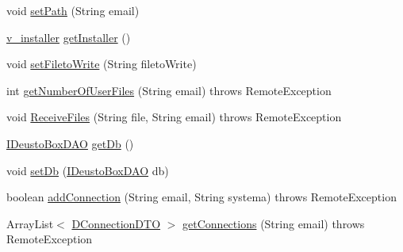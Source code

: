 \begin{DoxyCompactItemize}
void \mbox{\hyperlink{classes_1_1deusto_1_1bspq18_1_1e6_1_1_deusto_box_1_1_server_1_1remote_1_1_deusto_box_remote_service_a713a21168a4d89ed58ebfe63e4a38739}{set\+Path}} (String email)
\item 
\mbox{\hyperlink{classes_1_1deusto_1_1bspq18_1_1e6_1_1_deusto_box_1_1_server_1_1gui_1_1v__installer}{v\+\_\+installer}} \mbox{\hyperlink{classes_1_1deusto_1_1bspq18_1_1e6_1_1_deusto_box_1_1_server_1_1remote_1_1_deusto_box_remote_service_ae2e8dc87a5f16722a6bec1a6ff87ed52}{get\+Installer}} ()
\item 
void \mbox{\hyperlink{classes_1_1deusto_1_1bspq18_1_1e6_1_1_deusto_box_1_1_server_1_1remote_1_1_deusto_box_remote_service_a376f731a1b4406b3aeaa65e60e62497d}{set\+Fileto\+Write}} (String fileto\+Write)
\item 
int \mbox{\hyperlink{classes_1_1deusto_1_1bspq18_1_1e6_1_1_deusto_box_1_1_server_1_1remote_1_1_deusto_box_remote_service_a2425af40ab1d0aaa9de2954d5d841807}{get\+Number\+Of\+User\+Files}} (String email)  throws Remote\+Exception 
\item 
void \mbox{\hyperlink{classes_1_1deusto_1_1bspq18_1_1e6_1_1_deusto_box_1_1_server_1_1remote_1_1_deusto_box_remote_service_ae5c7e627a97bbc28925516e8af17fbc6}{Receive\+Files}} (String file, String email)  throws Remote\+Exception 
\item 
\mbox{\hyperlink{interfacees_1_1deusto_1_1bspq18_1_1e6_1_1_deusto_box_1_1_server_1_1jdo_1_1dao_1_1_i_deusto_box_d_a_o}{I\+Deusto\+Box\+D\+AO}} \mbox{\hyperlink{classes_1_1deusto_1_1bspq18_1_1e6_1_1_deusto_box_1_1_server_1_1remote_1_1_deusto_box_remote_service_a811146764b30a4eb510186a5386cfb9f}{get\+Db}} ()
\item 
void \mbox{\hyperlink{classes_1_1deusto_1_1bspq18_1_1e6_1_1_deusto_box_1_1_server_1_1remote_1_1_deusto_box_remote_service_a8e50775bac7b503ff10844d7c2b7fcda}{set\+Db}} (\mbox{\hyperlink{interfacees_1_1deusto_1_1bspq18_1_1e6_1_1_deusto_box_1_1_server_1_1jdo_1_1dao_1_1_i_deusto_box_d_a_o}{I\+Deusto\+Box\+D\+AO}} db)
\item 
boolean \mbox{\hyperlink{classes_1_1deusto_1_1bspq18_1_1e6_1_1_deusto_box_1_1_server_1_1remote_1_1_deusto_box_remote_service_af3b4ec328dd57b15aefff6d9112dab94}{add\+Connection}} (String email, String systema)  throws Remote\+Exception 
\item 
Array\+List$<$ \mbox{\hyperlink{classes_1_1deusto_1_1bspq18_1_1e6_1_1_deusto_box_1_1_server_1_1dto_1_1_d_connection_d_t_o}{D\+Connection\+D\+TO}} $>$ \mbox{\hyperlink{classes_1_1deusto_1_1bspq18_1_1e6_1_1_deusto_box_1_1_server_1_1remote_1_1_deusto_box_remote_service_adae22cc31bb23023630a6d333318363c}{get\+Connections}} (String email)  throws Remote\+Exception 

\end{DoxyCompactItemize}
